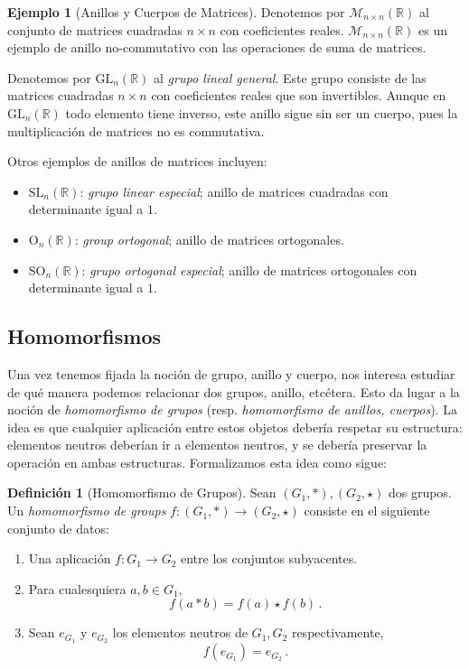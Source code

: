 \documentclass[a4paper,11pt]{amsart}
\newcommand{\mcal}{\mathcal{M}}
\theoremstyle{plain}
\theoremstyle{definition}
\newtheorem{defi}[thm]{Definición}
\newtheorem{ej}[thm]{Ejemplo}
\theoremstyle{remark}
\begin{document}
\begin{ej}[Anillos y Cuerpos de Matrices]
Denotemos por $\mcal_{n \times n}(\mathbb{R})$ al conjunto de matrices cuadradas $n \times n$ con coeficientes reales. $\mcal_{n \times n}(\mathbb{R})$ es un ejemplo de anillo no-commutativo con las operaciones de suma de matrices.

Denotemos por $\text{GL}_n(\mathbb{R})$ al \textit{grupo lineal general}. Este grupo consiste de las matrices cuadradas $n \times n$ con coeficientes reales que son invertibles. Aunque en $\text{GL}_n(\mathbb{R})$ todo elemento tiene inverso, este anillo sigue sin ser un cuerpo, pues la multiplicación de matrices no es commutativa. 

Otros ejemplos de anillos de matrices incluyen: 
\begin{itemize}
    \item $\text{SL}_n(\mathbb{R})$: \textit{grupo linear especial}; anillo de matrices cuadradas con determinante igual a $1$. 
    \item $\text{O}_n(\mathbb{R})$: \textit{group ortogonal}; anillo de matrices ortogonales.
    \item $\text{SO}_n(\mathbb{R})$: \textit{grupo ortogonal especial}; anillo de matrices ortogonales con determinante igual a $1$. 
\end{itemize}
\end{ej}


\subsection{Homomorfismos}


Una vez tenemos fijada la noción de grupo, anillo y cuerpo, nos interesa estudiar de qué manera podemos relacionar dos grupos, anillo, etcétera. Esto da lugar a la noción de \textit{homomorfismo de grupos} (resp. \textit{homomorfismo de anillos, cuerpos}). La idea es que cualquier aplicación entre estos objetos debería respetar su estructura: elementos neutros deberían ir a elementos neutros, y se debería preservar la operación en ambas estructuras. Formalizamos esta idea como sigue:

\begin{defi}[Homomorfismo de Grupos]
Sean $(G_1, *), (G_2, \star)$ dos grupos. Un \textit{homomorfismo de groups} $f \colon (G_1, *) \to (G_2, \star)$ consiste en el siguiente conjunto de datos: 
\begin{enumerate}[label = \arabic*)]
    \item Una aplicación $f \colon G_1 \to G_2$ entre los conjuntos subyacentes.
    \item Para cualesquiera $a, b \in G_1$, 
    \[ f(a * b) = f(a) \star f(b) \, .\]
    \item Sean $e_{G_1}$ y $e_{G_2}$ los elementos neutros de $G_1, G_2$ respectivamente, 
    \[ f(e_{G_1}) = e_{G_2} \, .\]
\end{enumerate}
\end{defi}
\end{document}
